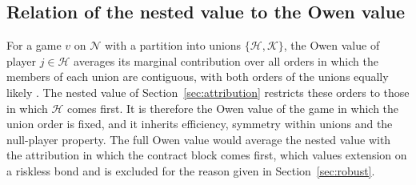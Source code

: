 \subsection{Relation of the nested value to the Owen value}

For a game $v$ on $\mathcal N$ with a partition into unions $\{\mathcal H,\mathcal K\}$, the
Owen value of player $j\in\mathcal H$ averages its marginal contribution over all orders in
which the members of each union are contiguous, with both orders of the unions equally
likely \citep{Owen1977}. The nested value of Section~\ref{sec:attribution} restricts these
orders to those in which $\mathcal H$ comes first. It is therefore the Owen value of the game
in which the union order is fixed, and it inherits efficiency, symmetry within unions and
the null-player property. The full Owen value would average the nested value with the
attribution in which the contract block comes first, which values extension on a riskless
bond and is excluded for the reason given in Section~\ref{sec:robust}.
